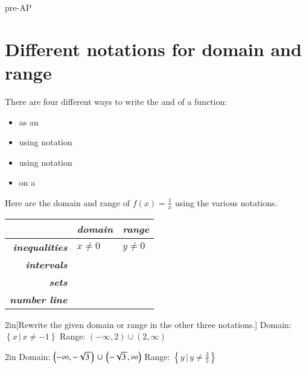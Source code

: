 \begin{taggedblock}{pre-AP}

\section{Different notations for domain and range}

There are four different ways to write the  and  
of a function:
\begin{itemize}[nosep]
    \item as an 
    \item using  notation
    \item using  notation
    \item on a 
\end{itemize}

Here are the domain and range of $f(x) = \frac{1}{x}$ using the various notations.

\begin{myCenteredBox}[width=6in, colback=white,]
\begin{center}
\large
\renewcommand{\arraystretch}{1.5}
\begin{tabular}{r||p{2in}|p{2in}}
                                     & {\bfseries\itshape domain} & {\bfseries\itshape range} \\ \hline
    {\bfseries\itshape inequalities} & $x \neq 0$ & $y \neq 0$ \\
    {\bfseries\itshape intervals}    & & \\
    {\bfseries\itshape sets}         & & \\
    {\bfseries\itshape number line}  & & \\
\end{tabular}
\end{center}
\end{myCenteredBox}


\begin{my2Problems}{2in}[Rewrite the given domain or range in the other three notations.]
    {
        Domain: $\left\{x \, | \, x \neq -1 \right\}$
    }
    {
        Range: $ (-\infty,2) \cup (2,\infty) $
    }
\end{my2Problems}
\begin{my2Problems}{2in}
    {
        Domain: $ \left(-\infty,-\myRoot{3}\right) \,\cup\, \left(-\myRoot{3},\infty\right) $
    }
    {
        Range: $\left\{y \, | \, y \neq \frac{3}{5} \right\}$
    }
\end{my2Problems}



    
\end{taggedblock}
